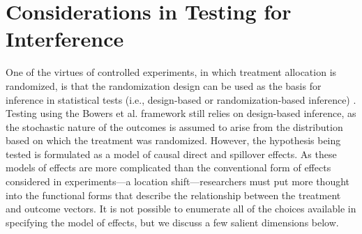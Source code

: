 \documentclass[12pt]{article}
\begin{document}
\section{Considerations in Testing for Interference}

One of the virtues of controlled experiments, in which treatment allocation is randomized, is that the randomization design can be used as the basis for inference in statistical tests (i.e., design-based or randomization-based inference) \citep{little2000causal}. Testing using the Bowers et al. framework still relies on design-based inference, as the stochastic nature of the outcomes is assumed to arise from the distribution based on which the treatment was randomized. However, the hypothesis being tested is formulated as a model of causal direct and spillover effects. As these models of effects are more complicated than the conventional form of effects considered in experiments---a location shift---researchers must put more thought into the functional forms that describe the relationship between the treatment and outcome vectors. It is not possible to enumerate all of the choices available in specifying the model of effects, but we discuss a few salient dimensions below. 
\end{document}
